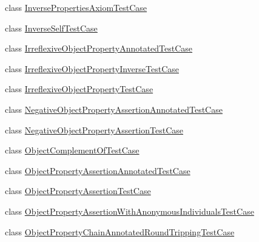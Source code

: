 \begin{DoxyCompactItemize}
class \hyperlink{classorg_1_1semanticweb_1_1owlapi_1_1api_1_1test_1_1objectproperties_1_1_inverse_properties_axiom_test_case}{Inverse\-Properties\-Axiom\-Test\-Case}
\item 
class \hyperlink{classorg_1_1semanticweb_1_1owlapi_1_1api_1_1test_1_1objectproperties_1_1_inverse_self_test_case}{Inverse\-Self\-Test\-Case}
\item 
class \hyperlink{classorg_1_1semanticweb_1_1owlapi_1_1api_1_1test_1_1objectproperties_1_1_irreflexive_object_property_annotated_test_case}{Irreflexive\-Object\-Property\-Annotated\-Test\-Case}
\item 
class \hyperlink{classorg_1_1semanticweb_1_1owlapi_1_1api_1_1test_1_1objectproperties_1_1_irreflexive_object_property_inverse_test_case}{Irreflexive\-Object\-Property\-Inverse\-Test\-Case}
\item 
class \hyperlink{classorg_1_1semanticweb_1_1owlapi_1_1api_1_1test_1_1objectproperties_1_1_irreflexive_object_property_test_case}{Irreflexive\-Object\-Property\-Test\-Case}
\item 
class \hyperlink{classorg_1_1semanticweb_1_1owlapi_1_1api_1_1test_1_1objectproperties_1_1_negative_object_property_assertion_annotated_test_case}{Negative\-Object\-Property\-Assertion\-Annotated\-Test\-Case}
\item 
class \hyperlink{classorg_1_1semanticweb_1_1owlapi_1_1api_1_1test_1_1objectproperties_1_1_negative_object_property_assertion_test_case}{Negative\-Object\-Property\-Assertion\-Test\-Case}
\item 
class \hyperlink{classorg_1_1semanticweb_1_1owlapi_1_1api_1_1test_1_1objectproperties_1_1_object_complement_of_test_case}{Object\-Complement\-Of\-Test\-Case}
\item 
class \hyperlink{classorg_1_1semanticweb_1_1owlapi_1_1api_1_1test_1_1objectproperties_1_1_object_property_assertion_annotated_test_case}{Object\-Property\-Assertion\-Annotated\-Test\-Case}
\item 
class \hyperlink{classorg_1_1semanticweb_1_1owlapi_1_1api_1_1test_1_1objectproperties_1_1_object_property_assertion_test_case}{Object\-Property\-Assertion\-Test\-Case}
\item 
class \hyperlink{classorg_1_1semanticweb_1_1owlapi_1_1api_1_1test_1_1objectproperties_1_1_object_property_assertifae0c5126ce01c483d2a76c42e79dfcf}{Object\-Property\-Assertion\-With\-Anonymous\-Individuals\-Test\-Case}
\item 
class \hyperlink{classorg_1_1semanticweb_1_1owlapi_1_1api_1_1test_1_1objectproperties_1_1_object_property_chain_a3a9fed56e257c1f8bd9b45bc96275449}{Object\-Property\-Chain\-Annotated\-Round\-Tripping\-Test\-Case}

\end{DoxyCompactItemize}
